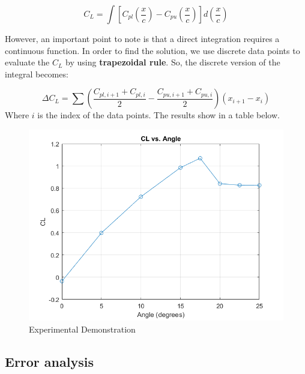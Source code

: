$$
C_{L}=\int\left[C_{p l}\left(\frac{x}{c}\right)-C_{p u}\left(\frac{x}{c}\right)\right]d\left(\frac{x}{c}\right)
$$

However, an important point to note is that a direct integration requires a continuous function. In order to find the solution, we use discrete data points to evaluate the $C_L$ by using \textbf{trapezoidal rule}. So, the discrete version of the integral becomes:

$$
\Delta C_{L}=\sum\left(\frac{C_{pl,i+1}+C_{pl,i}}{2}-\frac{C_{p u ,i+1}+C_{p u ,i}}{2}\right)\left(x_{i+1}-x_{i}\right)
$$
Where $i$ is the index of the data points. The results show in a table below.

\begin{table}[]
    \end{table}

    \begin{figure}[htb] %
        \centering
        \includegraphics[scale=0.45]{CL.png}
        \caption{Experimental Demonstration}
        \label{fig:demo}
    \end{figure}



\subsection*{Error analysis}


